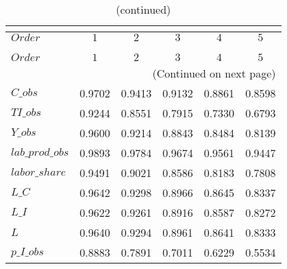  
\begin{center}
\begin{longtable}{lccccc} 
\caption{COEFFICIENTS OF AUTOCORRELATION}\\
 \label{Table:th_autocorr_matrix}\\
\toprule 
$Order           $	 & 	 $         1$	 & 	 $         2$	 & 	 $         3$	 & 	 $         4$	 & 	 $         5$\\
\midrule \endfirsthead 
\caption{(continued)}\\
 \toprule \\ 
$Order           $	 & 	 $         1$	 & 	 $         2$	 & 	 $         3$	 & 	 $         4$	 & 	 $         5$\\
\midrule \endhead 
\midrule \multicolumn{6}{r}{(Continued on next page)} \\ \bottomrule \endfoot 
\bottomrule \endlastfoot 
$C\_obs          $	 & 	    0.9702	 & 	    0.9413	 & 	    0.9132	 & 	    0.8861	 & 	    0.8598 \\ 
$TI\_obs         $	 & 	    0.9244	 & 	    0.8551	 & 	    0.7915	 & 	    0.7330	 & 	    0.6793 \\ 
$Y\_obs          $	 & 	    0.9600	 & 	    0.9214	 & 	    0.8843	 & 	    0.8484	 & 	    0.8139 \\ 
$lab\_prod\_obs  $	 & 	    0.9893	 & 	    0.9784	 & 	    0.9674	 & 	    0.9561	 & 	    0.9447 \\ 
$labor\_share    $	 & 	    0.9491	 & 	    0.9021	 & 	    0.8586	 & 	    0.8183	 & 	    0.7808 \\ 
$L\_C            $	 & 	    0.9642	 & 	    0.9298	 & 	    0.8966	 & 	    0.8645	 & 	    0.8337 \\ 
$L\_I            $	 & 	    0.9622	 & 	    0.9261	 & 	    0.8916	 & 	    0.8587	 & 	    0.8272 \\ 
$L               $	 & 	    0.9640	 & 	    0.9294	 & 	    0.8961	 & 	    0.8641	 & 	    0.8333 \\ 
$p\_I\_obs       $	 & 	    0.8883	 & 	    0.7891	 & 	    0.7011	 & 	    0.6229	 & 	    0.5534 \\ 
\end{longtable}
 \end{center}
